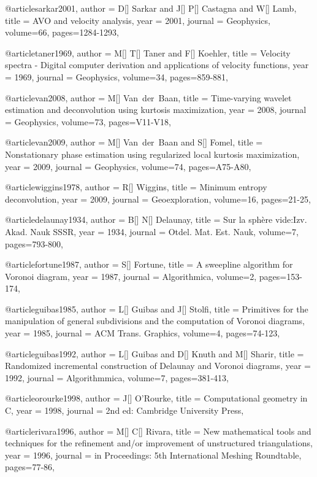 {@article{sarkar2001,
  author =	 {D[] Sarkar and J[] P[] Castagna and W[] Lamb},
  title =	 {AVO and velocity analysis},
  year =	 2001,
  journal =	 {Geophysics},
  volume={66},
 pages=1284-1293,
}

@article{taner1969,
  author =	 {M[] T[] Taner and F[] Koehler},
  title =	 {Velocity spectra - Digital computer derivation and applications of velocity functions},
  year =	 1969,
  journal =	 {Geophysics},
  volume={34},
 pages=859-881,
}

@article{van2008,
  author =	 {M[] Van~der~Baan},
  title =	 {Time-varying wavelet estimation and deconvolution using kurtosis maximization},
  year =	 2008,
  journal =	 {Geophysics},
  volume={73},
 pages=V11-V18,
}

@article{van2009,
  author =	 {M[] Van~der~Baan and S[] Fomel},
  title =	 {Nonstationary phase estimation using regularized local kurtosis maximization},
  year =	 2009,
  journal =	 {Geophysics},
  volume={74},
 pages=A75-A80,
}

@article{wiggins1978,
  author =	 {R[] Wiggins},
  title =	 {Minimum entropy deconvolution},
  year =	 2009,
  journal =	 {Geoexploration},
  volume={16},
 pages=21-25,
}

@article{delaunay1934,
  author =	 {B[] N[] Delaunay},
  title =	 {Sur la sph\`{e}re vide:Izv. Akad. Nauk SSSR},
  year =	 1934,
  journal =	 {Otdel. Mat. Est. Nauk},
  volume={7},
 pages=793-800,
}

@article{fortune1987,
  author =	 {S[] Fortune},
  title =	 {A sweepline algorithm for Voronoi diagram},
  year =	 1987,
  journal =	 {Algorithmica},
  volume={2},
 pages=153-174,
}

@article{guibas1985,
  author =	 {L[] Guibas and J[] Stolfi},
  title =	 {Primitives for the manipulation of general subdivisions and the computation of Voronoi diagrams},
  year =	 1985,
  journal =	 {ACM Trans. Graphics},
  volume={4},
 pages=74-123,
}

@article{guibas1992,
  author =	 {L[] Guibas and D[] Knuth and M[] Sharir},
  title =	 {Randomized incremental construction of Delaunay and Voronoi diagrams},
  year =	 1992,
  journal =	 {Algorithmmica},
  volume={7},
 pages=381-413,
}

@article{orourke1998,
  author =	 {J[] O'Rourke},
  title =	 {Computational geometry in C},
  year =	 1998,
  journal =	 {2nd ed: Cambridge University Press},
}

@article{rivara1996,
  author =	 {M[] C[] Rivara},
  title =	 {New mathematical tools and techniques for the refinement and/or improvement of unstructured triangulations},
  year =	 1996,
  journal =	 {in Proceedings: 5th International Meshing Roundtable},
 pages=77-86,
}

}
